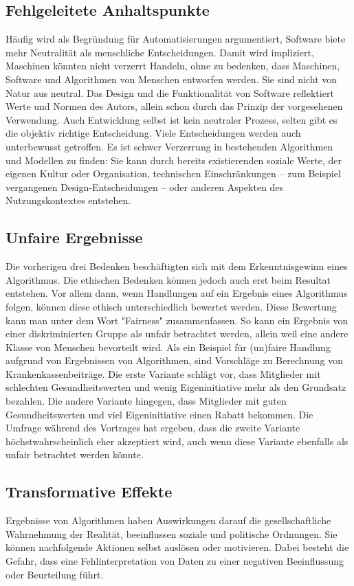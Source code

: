 \subsection{Fehlgeleitete Anhaltspunkte}
Häufig wird als Begründung für Automatisierungen argumentiert, Software biete mehr Neutralität als menschliche Entscheidungen. Damit wird impliziert, Maschinen könnten nicht verzerrt Handeln, ohne zu bedenken, dass Maschinen, Software und Algorithmen von Menschen entworfen werden. Sie sind nicht von Natur aus neutral. Das Design und die Funktionalität von Software reflektiert Werte und Normen des Autors, allein schon durch das Prinzip der vorgesehenen Verwendung. Auch Entwicklung selbst ist kein neutraler Prozess, selten gibt es die objektiv richtige Entscheidung. Viele Entscheidungen werden auch unterbewusst getroffen. Es ist schwer Verzerrung in bestehenden Algorithmen und Modellen zu finden: Sie kann durch bereits existierenden soziale Werte, der eigenen Kultur oder Organisation, technischen Einschränkungen -- zum Beispiel vergangenen Design-Entscheidungen -- oder anderen Aspekten des Nutzungskontextes entstehen.

\subsection{Unfaire Ergebnisse}

Die vorherigen drei Bedenken beschäftigten sich mit dem Erkenntnisgewinn eines Algorithmus. Die ethischen Bedenken können jedoch auch erst beim Resultat entstehen. Vor allem dann, wenn Handlungen auf ein Ergebnis eines Algorithmus folgen, können diese ethisch unterschiedlich bewertet werden. Diese Bewertung kann man unter dem Wort "Fairness" zusammenfassen. 
So kann ein Ergebnis von einer diskriminierten Gruppe als unfair betrachtet werden, allein weil eine andere Klasse von Menschen bevorteilt wird. 
Als ein Beispiel für (un)faire Handlung aufgrund von Ergebnissen von Algorithmen, sind Vorschläge zu Berechnung von Krankenkassenbeiträge. Die erste Variante schlägt vor, dass Mitglieder mit schlechten Gesundheitswerten und wenig Eigeninitiative mehr als den Grundsatz bezahlen. Die andere Variante hingegen, dass Mitglieder mit guten Gesundheitswerten und viel Eigeninitiative einen Rabatt bekommen. 
Die Umfrage während des Vortrages hat ergeben, dass die zweite Variante höchstwahrscheinlich eher akzeptiert wird, auch wenn diese Variante ebenfalls als unfair betrachtet werden könnte.


\subsection{Transformative Effekte}
Ergebnisse von Algorithmen haben Auswirkungen darauf die gesellschaftliche Wahrnehmung der Realität, beeinflussen soziale und politische Ordnungen. Sie können nachfolgende Aktionen selbst auslösen oder motivieren. Dabei besteht die Gefahr, dass eine Fehlinterpretation von Daten zu einer negativen Beeinflussung oder Beurteilung führt.

